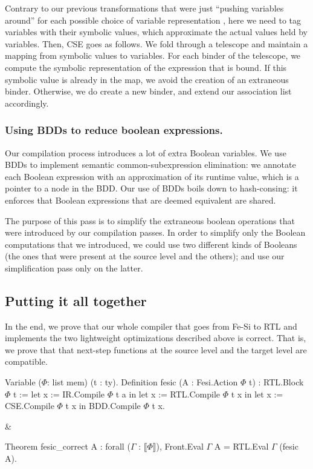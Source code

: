 \documentclass{llncs}
\newcommand{\denote}[1]{\llbracket #1 \rrbracket}
\begin{document}
Contrary to our previous transformations that were just ``pushing
variables around'' for each possible choice of variable representation
, here we need to tag variables with their symbolic values,
which approximate the actual values held by variables.
% 
%
Then, CSE goes as follows. We fold through a telescope and maintain a
mapping from symbolic values to variables. For each binder of the
telescope, we compute the symbolic representation of the expression
that is bound. 
%
If this symbolic value is already in the map, we avoid the creation of
an extraneous binder. Otherwise, we do create a new binder, and extend
our association list accordingly. 
 

\subsubsection{Using BDDs to reduce boolean expressions.}
Our compilation process introduces a lot of extra Boolean
variables. We use BDDs to implement semantic common-subexpression
elimination: we annotate each Boolean expression with an approximation
of its runtime value, which is a pointer to a node in the BDD. 
%
Our use of BDDs boils down to hash-consing: it enforces that Boolean
expressions that are deemed equivalent are shared.

The purpose of this pass is to simplify the extraneous boolean
operations that were introduced by our compilation passes. In order to
simplify only the Boolean computations that we introduced, we could
use two different kinds of Booleans (the ones that were present at the
source level and the others); and use our simplification pass only on
the latter.

\subsection{Putting it all together}
In the end, we prove that our whole compiler that goes from Fe-Si to
RTL and implements the two lightweight optimizations described above
is correct. That is, we prove that that next-step functions at the
source level and the target level are compatible.

\begin{twolistings}
  \begin{coq}
Variable ($\Phi$: list mem) (t : ty). 
Definition fesic  (A : Fesi.Action $\Phi$ t) : RTL.Block $\Phi$ t :=
  let x := IR.Compile $\Phi$  t a in
  let x := RTL.Compile $\Phi$ t x in 
  let x := CSE.Compile $\Phi$ t x in  
  BDD.Compile $\Phi$ t x.
\end{coq}
&
\begin{coq}
Theorem fesic_correct A :
forall ($\Gamma$ : $\denote{\Phi}$), 
Front.Eval $\Gamma$ A = 
RTL.Eval $\Gamma$ (fesic A).

$ $
\end{coq}
\end{twolistings}
\end{document}
